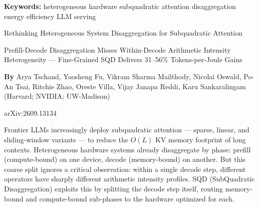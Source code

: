 \documentclass[10pt,twocolumn]{article}
\begin{document}
\setlength{\parindent}{0pt}
\setlength{\parskip}{4pt}

{\small\color{keywordgray}\textbf{Keywords:}
  heterogeneous hardware \textbullet{}
  subquadratic attention \textbullet{}
  disaggregation \textbullet{}
  energy efficiency \textbullet{}
  LLM serving}\par\vspace{4pt}

{\LARGE\bfseries\raggedright
  Rethinking Heterogeneous System
  Disaggregation for Subquadratic Attention}\par\vspace{4pt}

{\large\itshape\raggedright
  Prefill-Decode Disaggregation Misses Within-Decode Arithmetic
  Intensity Heterogeneity --- Fine-Grained SQD Delivers
  31--56\% Tokens-per-Joule Gains}\par\vspace{6pt}

{\small\textbf{By} Arya Tschand, Yaosheng Fu, Vikram Sharma Mailthody,
  Nicolai Oswald, Po-An Tsai, Ritchie Zhao, Oreste Villa,
  Vijay Janapa Reddi, Karu Sankaralingam
  (Harvard; NVIDIA; UW-Madison)}\par\vspace{2pt}

{\small\color{keywordgray}arXiv:2609.13134}
\par\vspace{2pt}\noindent{\color{rulered}\rule{\columnwidth}{0.6pt}}\vspace{6pt}

Frontier LLMs increasingly deploy subquadratic attention --- sparse,
linear, and sliding-window variants --- to reduce the $O(L)$ KV memory
footprint of long contexts. Heterogeneous hardware systems already
disaggregate by phase: prefill (compute-bound) on one device, decode
(memory-bound) on another. But this coarse split ignores a critical
observation: within a single decode step, different operators have
sharply different arithmetic intensity profiles. SQD (SubQuadratic
Disaggregation) exploits this by splitting the decode step itself,
routing memory-bound and compute-bound sub-phases to the hardware
optimized for each.
\end{document}
